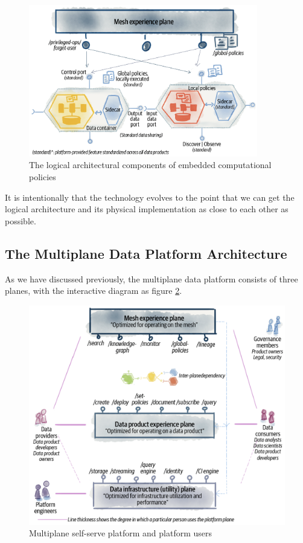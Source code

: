 \documentclass[12pt, a4paper]{book}
\begin{document}
\begin{figure}[ht]
	\begin{framed}
		\centering
		\includegraphics[width=10cm]{LogicalComponents.png}
		\caption{The logical architectural components of embedded computational policies}
		\label{LogicalComponents}
	\end{framed}
\end{figure}
\vspace{-.5cm}
It is intentionally that the technology evolves to the point that we can get the logical architecture and its physical implementation as close to each other as possible. \cite{datamesh2022p3}


\subsection{The Multiplane Data Platform Architecture}
As we have discussed previously, the multiplane data platform consists of three planes, with the interactive diagram as figure \ref{multiplane}.

\begin{figure}[ht]
	\begin{framed}
		\centering
		\includegraphics[width=12cm]{multiplane.png}
		\caption{Multiplane self-serve platform and platform users}
		\label{multiplane}
	\end{framed}
	\vspace{-.5cm}
\end{figure}
\end{document}
